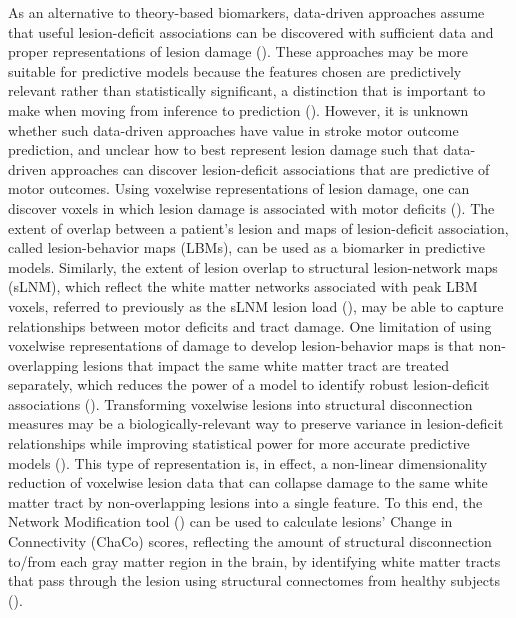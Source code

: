 \documentclass[10pt]{article}
\begin{document}
As an alternative to theory-based biomarkers, data-driven approaches assume that useful lesion-deficit associations can be discovered with sufficient data and proper representations of lesion damage (\cite{Kasties2021-rm, Bourached2022-vz}). These approaches may be more suitable for predictive models because the features chosen are predictively relevant rather than statistically significant, a distinction that is important to make when moving from inference to prediction (\cite{Bzdok2020-py}). However, it is unknown whether such data-driven approaches have value in stroke motor outcome prediction, and unclear how to best represent lesion damage such that data-driven approaches can discover lesion-deficit associations that are predictive of motor outcomes. Using voxelwise representations of lesion damage, one can discover voxels in which lesion damage is associated with motor deficits (\cite{Bowren2022-rs}). The extent of overlap between a patient's lesion and maps of lesion-deficit association, called lesion-behavior maps (LBMs), can be used as a biomarker in predictive models. Similarly, the extent of lesion overlap to structural lesion-network maps (sLNM), which reflect the white matter networks associated with peak LBM voxels, referred to previously as the sLNM lesion load (\cite{Bowren2022-rs}), may be able to capture relationships between motor deficits and tract damage. One limitation of using voxelwise representations of damage to develop lesion-behavior maps is that non-overlapping lesions that impact the same white matter tract are treated separately, which reduces the power of a model to identify robust lesion-deficit associations (\cite{Sperber2022-oj}). Transforming voxelwise lesions into structural disconnection measures may be a biologically-relevant way to preserve variance in lesion-deficit relationships while improving statistical power for more accurate predictive models (\cite{Sperber2022-oj}). This type of representation is, in effect, a non-linear dimensionality reduction of voxelwise lesion data that can collapse damage to the same white matter tract by non-overlapping lesions into a single feature. To this end, the Network Modification tool (\cite{Kuceyeski2013-nk}) can be used to calculate lesions' Change in Connectivity (ChaCo) scores, reflecting the amount of structural disconnection to/from each gray matter region in the brain, by identifying white matter tracts that pass through the lesion using structural connectomes from healthy subjects (\cite{Kuceyeski2013-nk, Kuceyeski2016-vj, Salvalaggio2020-pe, Griffis2019-cy, Sperber2022-oj}).
 
\end{document}

